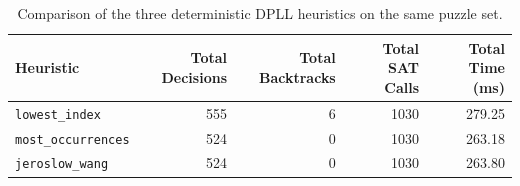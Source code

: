 \begin{table}[h!]
\centering
\small
\begin{tabular}{|l|r|r|r|r|}
\hline
\textbf{Heuristic} & \textbf{Total Decisions} & \textbf{Total Backtracks} & \textbf{Total SAT Calls} & \textbf{Total Time (ms)} \\ \hline
\texttt{lowest\_index} & 555 & 6 & 1030 & 279.25 \\ \hline
\texttt{most\_occurrences} & 524 & 0 & 1030 & 263.18 \\ \hline
\texttt{jeroslow\_wang} & 524 & 0 & 1030 & 263.80 \\ \hline
\end{tabular}
\caption{Comparison of the three deterministic DPLL heuristics on the same puzzle set.}
\label{tab:heuristics}
\end{table}
